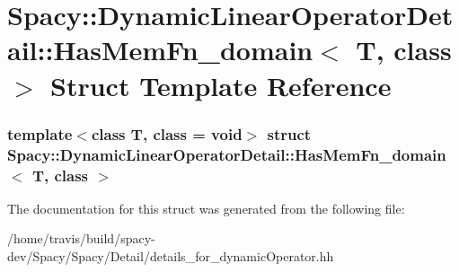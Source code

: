 \hypertarget{structSpacy_1_1DynamicLinearOperatorDetail_1_1HasMemFn__domain}{\section{\-Spacy\-:\-:\-Dynamic\-Linear\-Operator\-Detail\-:\-:\-Has\-Mem\-Fn\-\_\-domain$<$ \-T, class $>$ \-Struct \-Template \-Reference}
\label{structSpacy_1_1DynamicLinearOperatorDetail_1_1HasMemFn__domain}
}
\subsubsection*{template$<$class T, class = void$>$ struct Spacy\-::\-Dynamic\-Linear\-Operator\-Detail\-::\-Has\-Mem\-Fn\-\_\-domain$<$ T, class $>$}



\-The documentation for this struct was generated from the following file\-:\begin{DoxyCompactItemize}
\item 
/home/travis/build/spacy-\/dev/\-Spacy/\-Spacy/\-Detail/details\-\_\-for\-\_\-dynamic\-Operator.\-hh\end{DoxyCompactItemize}
